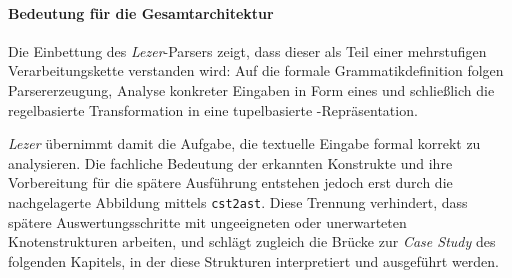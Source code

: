 \paragraph{Bedeutung für die Gesamtarchitektur}

Die Einbettung des \emph{Lezer}-Parsers zeigt, dass dieser als Teil einer mehrstufigen Verarbeitungskette verstanden wird: Auf die formale Grammatikdefinition folgen Parsererzeugung, Analyse konkreter Eingaben in Form eines  und schließlich die regelbasierte Transformation in eine tupelbasierte -Repräsentation.

\emph{Lezer} übernimmt damit die Aufgabe, die textuelle Eingabe formal korrekt zu analysieren. Die fachliche Bedeutung der erkannten Konstrukte und ihre Vorbereitung für die spätere Ausführung entstehen jedoch erst durch die nachgelagerte Abbildung mittels \texttt{cst2ast}. Diese Trennung verhindert, dass spätere Auswertungsschritte mit ungeeigneten oder unerwarteten Knotenstrukturen arbeiten, und schlägt zugleich die Brücke zur \textit{Case Study} des folgenden Kapitels, in der diese Strukturen interpretiert und ausgeführt werden.